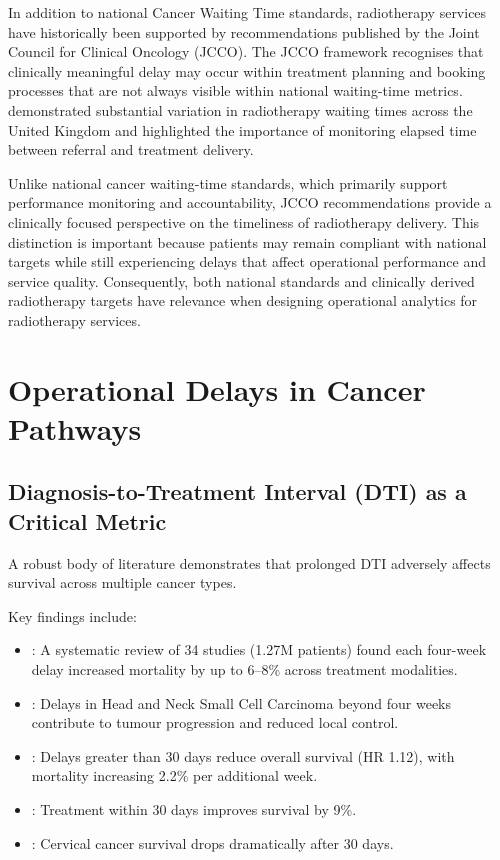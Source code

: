 In addition to national Cancer Waiting Time standards, radiotherapy services have historically been supported by recommendations published by the Joint Council for Clinical Oncology (JCCO). The JCCO framework recognises that clinically meaningful delay may occur within treatment planning and booking processes that are not always visible within national waiting-time metrics. \cite{ash2004} demonstrated substantial variation in radiotherapy waiting times across the United Kingdom and highlighted the importance of monitoring elapsed time between referral and treatment delivery. 

Unlike national cancer waiting-time standards, which primarily support performance monitoring and accountability, JCCO recommendations provide a clinically focused perspective on the timeliness of radiotherapy delivery. This distinction is important because patients may remain compliant with national targets while still experiencing delays that affect operational performance and service quality. Consequently, both national standards and clinically derived radiotherapy targets have relevance when designing operational analytics for radiotherapy services.


\section{Operational Delays in Cancer Pathways}

\subsection{Diagnosis-to-Treatment Interval (DTI) as a Critical Metric}

A robust body of literature demonstrates that prolonged DTI adversely affects survival across multiple cancer types.

Key findings include:

\begin{itemize}
    \item \cite{hanna2020}: A systematic review of 34 studies (1.27M patients) found each four-week delay increased mortality by up to 6–8\% across treatment modalities.
    \item \cite{coca-pelaz2018}: Delays in Head and Neck Small Cell Carcinoma beyond four weeks contribute to tumour progression and reduced local control.
    \item \cite{sharma2016}: Delays greater than 30 days reduce overall survival (HR 1.12), with mortality increasing 2.2\% per additional week.
    \item \cite{villemure-poliquin2025}: Treatment within 30 days improves survival by 9\%.
    \item \cite{saleh2024}: Cervical cancer survival drops dramatically after 30 days.
\end{itemize}


